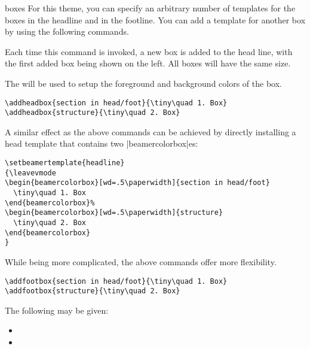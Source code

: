 \begin{themeexample}{boxes}
  For this theme, you can specify an arbitrary number of templates for the boxes in the headline and in the footline. You can add a template for another box by using the following commands.

  \begin{command}{\addheadbox{}}
    Each time this command is invoked, a new box is added to the head line, with the first added box being shown on the left. All boxes will have the same size.

    The  will be used to setup the foreground and background colors of the box.

    \example
\begin{verbatim}
\addheadbox{section in head/foot}{\tiny\quad 1. Box}
\addheadbox{structure}{\tiny\quad 2. Box}
\end{verbatim}

    A similar effect as the above commands can be achieved by directly installing a head template that contains two |beamercolorbox|es:

\begin{verbatim}
\setbeamertemplate{headline}
{\leavevmode
\begin{beamercolorbox}[wd=.5\paperwidth]{section in head/foot}
  \tiny\quad 1. Box
\end{beamercolorbox}%
\begin{beamercolorbox}[wd=.5\paperwidth]{structure}
  \tiny\quad 2. Box
\end{beamercolorbox}
}
\end{verbatim}

    While being more complicated, the above commands offer more flexibility.
  \end{command}

  \begin{command}{\addfootbox{}}
    \example
\begin{verbatim}
\addfootbox{section in head/foot}{\tiny\quad 1. Box}
\addfootbox{structure}{\tiny\quad 2. Box}
\end{verbatim}
  \end{command}

The following  may be given:
  \begin{itemize}
  \item {}
  \item {}
  \end{itemize}
\end{themeexample}


